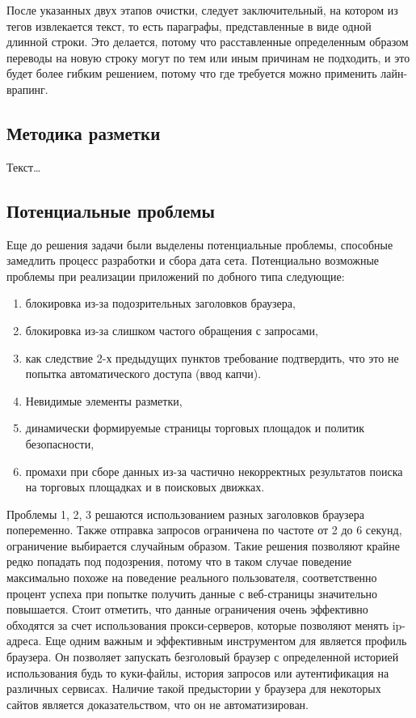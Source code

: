 \documentclass[../main]{subfiles}
\begin{document}
После указанных двух этапов очистки, следует заключительный, на котором из тегов извлекается текст, то есть параграфы, представленные в виде одной длинной строки. Это делается, потому что расставленные определенным образом переводы на новую строку могут по тем или иным причинам не подходить, и это будет более гибким решением, потому что где требуется можно применить лайн-врапинг.

\subsection{Методика разметки}
Текст\dots

\subsection{Потенциальные проблемы}
Еще до решения задачи были выделены потенциальные проблемы, способные замедлить процесс разработки и сбора дата сета. Потенциально возможные проблемы при реализации приложений по добного типа следующие:
\begin{enumerate}
    \item блокировка из-за подозрительных заголовков браузера,
    \item блокировка из-за слишком частого обращения с запросами,
    \item как следствие 2-х предыдущих пунктов требование подтвердить, что это не попытка автоматического доступа (ввод капчи).
    \item Невидимые элементы разметки,
    \item динамически формируемые страницы торговых площадок и политик безопасности,
    \item промахи при сборе данных из-за частично некорректных результатов поиска на торговых площадках и в поисковых движках.
\end{enumerate}

Проблемы 1, 2, 3 решаются использованием разных заголовков браузера попеременно. Также отправка запросов ограничена по частоте от 2 до 6 секунд, ограничение выбирается случайным образом. Такие решения позволяют крайне редко попадать под подозрения, потому что в таком случае поведение максимально похоже на поведение реального пользователя, соответственно процент успеха при попытке получить данные с веб-страницы значительно повышается. Стоит отметить, что данные ограничения очень эффективно обходятся за счет использования прокси-серверов, которые позволяют менять ip-адреса. Еще одним важным и эффективным инструментом для является профиль браузера. Он позволяет запускать безголовый браузер с определенной историей использования будь то куки-файлы, история запросов или аутентификация на различных сервисах. Наличие такой предыстории у браузера для некоторых сайтов является доказательством, что он не автоматизирован.
\end{document}

